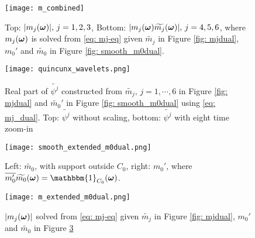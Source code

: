 \begin{figure}
\centering
\texttt{[image: m\_combined]}
\caption{Top: $|m_j(\boldsymbol{\omega})|,\, j= 1,2,3$,
Bottom: $|m_j(\boldsymbol{\omega})\widetilde{m_{j}}(\boldsymbol{\omega})|,\, j=4,5,6$, where $m_j(\boldsymbol{\omega})$ is solved from \eqref{eq: mj-eq} given $\widetilde{m_j}$ in Figure \ref{fig: mjdual}, $m_0'$ and $\widetilde{m_0}$ in Figure \ref{fig: smooth_m0dual}.}
\label{fig: m_j}
\end{figure}

\begin{comment}
\begin{figure}
\centering
\texttt{[image: m.png]}
\caption{ $|m_j(\V{\omega})|$, where $m_j(\V{\omega})$ is solved from \eqref{eq: mj-eq} given $\widetilde{m_j}$ in Figure \ref{fig: mjdual}, $m_0'$ and $\widetilde{m_0}'$ in Figure \ref{fig: smooth_m0dual}. }
\label{fig: m_j}
\end{figure}

\begin{figure}
\centering
\texttt{[image: m\_mdual.png]}
\caption{ $|m_j(\V{\omega})\m{j}|$ for $m_j$ in Figure \ref{fig: m_j} and $\widetilde{m_j}$ in Figure \ref{fig: mjdual}. }
\label{fig: m_j_mjdual}
\end{figure}
\end{comment}

\begin{figure}
\centering
\texttt{[image: quincunx\_wavelets.png]}
\caption{ Real part of $\widetilde{\psi^j}$ constructed from $\widetilde{m_j},\, j=1,\cdots, 6$ in Figure \ref{fig: mjdual} and $\widetilde{m_0}'$ in Figure \ref{fig: smooth_m0dual} using \eqref{eq: mj_dual}. Top: $\widetilde{\psi^j}$ without scaling, bottom: $\widetilde{\psi^j}$ with eight time zoom-in } 
\label{fig: wavelets}
\end{figure}

\begin{figure}[h]
\centering
\texttt{[image: smooth\_extended\_m0dual.png]}
\caption{ Left: $\widetilde{m_0}$, with support outside $C_0$, right: $m_0'$, where $ \overline{m_0'}\m{0}  = \mathbbm{1}_{C_0}(\V{\omega})$.}
\label{fig: smooth_m0dual-slow}
\end{figure}

\begin{figure}
\texttt{[image: m\_extended\_m0dual.png]}
\caption{$|m_j(\boldsymbol{\omega})|$ solved from \eqref{eq: mj-eq} given $\widetilde{m_j}$ in Figure \ref{fig: mjdual}, $m_0'$ and $\widetilde{m_0}$ in Figure \ref{fig: smooth_m0dual-slow}}
\label{fig: m_j-slow}
\end{figure}



